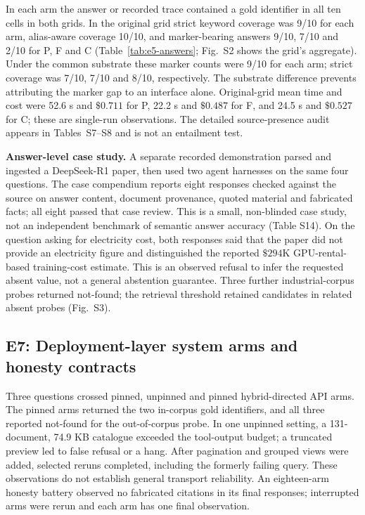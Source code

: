 In each arm the answer or recorded trace contained a gold identifier in all
ten cells in both grids. In the
original grid strict keyword coverage was 9/10 for each arm, alias-aware
coverage 10/10, and marker-bearing answers 9/10, 7/10 and 2/10 for P, F and
C (Table~\ref{tab:e5-answers}; Fig.~S2 shows the grid's aggregate). Under the common substrate these marker
counts were 9/10 for each arm; strict coverage was 7/10, 7/10 and 8/10,
respectively. The substrate difference prevents attributing the marker gap to
an interface alone. Original-grid mean time and cost were 52.6 s and $\$0.711$
for P, 22.2 s and $\$0.487$ for F, and 24.5 s and $\$0.527$ for C; these are
single-run observations. The detailed source-presence audit appears in
Tables~S7--S8 and is not an entailment test.

\textbf{Answer-level case study.} A separate recorded demonstration parsed and
ingested a DeepSeek-R1 paper, then used two agent harnesses on the same four
questions. The case compendium reports eight responses checked against the
source on answer content, document provenance, quoted material and fabricated
facts; all eight passed that case review. This is a small, non-blinded case
study, not an independent benchmark of semantic answer accuracy (Table S14). On the
question asking for electricity cost, both responses said that the paper did
not provide an electricity figure and distinguished the reported $\$294$K
GPU-rental-based training-cost estimate. This is an observed refusal to infer
the requested absent value, not a general abstention guarantee. Three further
industrial-corpus probes returned not-found; the retrieval threshold retained
candidates in related absent probes (Fig.~S3).

\subsection{E7: Deployment-layer system arms and honesty contracts}
\label{sec:sysarms}
Three questions crossed pinned, unpinned and pinned hybrid-directed API arms.
The pinned arms returned the two in-corpus gold identifiers, and all three
reported not-found for the out-of-corpus probe. In one unpinned setting, a
131-document, 74.9 KB catalogue exceeded the tool-output budget; a truncated
preview led to false refusal or a hang. After pagination and grouped views were
added, selected reruns completed, including the formerly failing query. These
observations do not establish general transport reliability. An eighteen-arm
honesty battery observed no fabricated citations in its final responses;
interrupted arms were rerun and each arm has one final observation.

